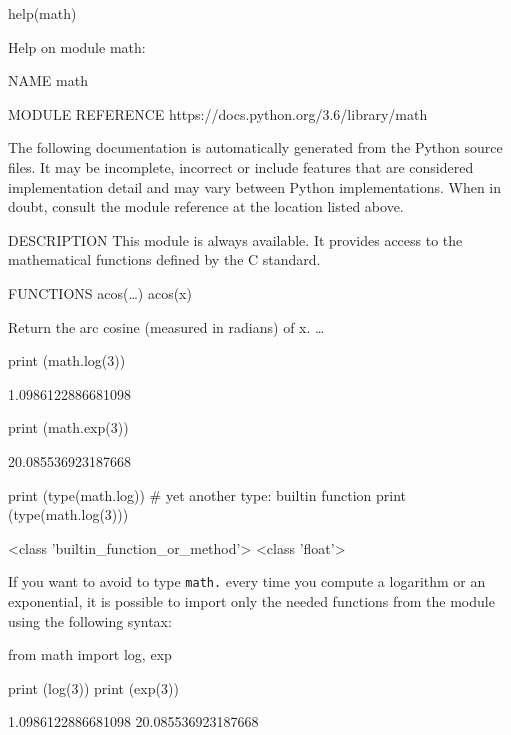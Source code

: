 \begin{ipython}
help(math)
\end{ipython}
\begin{ioutput}
Help on module math:

NAME
math

MODULE REFERENCE
https://docs.python.org/3.6/library/math

The following documentation is automatically generated from the Python
source files.  It may be incomplete, incorrect or include features that
are considered implementation detail and may vary between Python
implementations.  When in doubt, consult the module reference at the
location listed above.

DESCRIPTION
This module is always available.  It provides access to the
mathematical functions defined by the C standard.

FUNCTIONS
acos(\dots)
acos(x)

Return the arc cosine (measured in radians) of x.
\ldots
\end{ioutput}

\begin{ipython}
print (math.log(3))
\end{ipython}
\begin{ioutput}
1.0986122886681098	
\end{ioutput}

\begin{ipython}
print (math.exp(3))
\end{ipython}
\begin{ioutput}
20.085536923187668	
\end{ioutput}

\begin{ipython}
print (type(math.log)) # yet another type: builtin function
print (type(math.log(3)))
\end{ipython}
\begin{ioutput}
<class 'builtin\_function\_or\_method'>
<class 'float'>	
\end{ioutput}

If you want to avoid to type \texttt{math.} every time you compute a logarithm or an exponential, it is possible to import only the needed functions from the module using the following syntax:

\begin{ipython}
from math import log, exp

print (log(3))
print (exp(3))
\end{ipython}
\begin{ioutput}
1.0986122886681098
20.085536923187668	
\end{ioutput}

